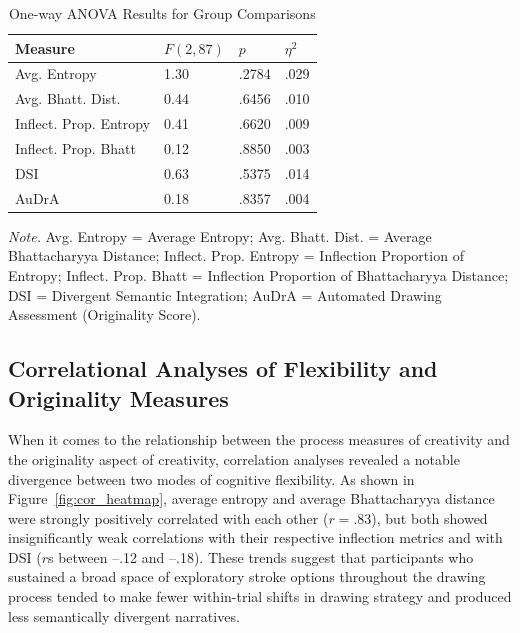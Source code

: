 \documentclass[../MA_Thesis.tex]{subfiles}
\begin{document}
\begin{table}[H]
\centering
\begin{threeparttable}
\caption{One-way ANOVA Results for Group Comparisons}
\label{tab:anova_results}
\begin{tabularx}{\textwidth}{lXXX}
\toprule
\textbf{Measure} & \textbf{$F(2, 87)$} & \textbf{$p$} & \textbf{$\eta^2$} \\
\midrule
Avg. Entropy & 1.30 & .2784 & .029 \\
Avg. Bhatt. Dist. & 0.44 & .6456 & .010 \\
Inflect. Prop. Entropy & 0.41 & .6620 & .009 \\
Inflect. Prop. Bhatt & 0.12 & .8850 & .003 \\
DSI & 0.63 & .5375 & .014 \\
AuDrA & 0.18 & .8357 & .004 \\
\bottomrule
\end{tabularx}
\begin{tablenotes}[flushleft]
\small
\item \textit{Note.} Avg. Entropy = Average Entropy; Avg. Bhatt. Dist. = Average Bhattacharyya Distance; Inflect. Prop. Entropy = Inflection Proportion of Entropy; Inflect. Prop. Bhatt = Inflection Proportion of Bhattacharyya Distance; DSI = Divergent Semantic Integration; AuDrA = Automated Drawing Assessment (Originality Score).
\end{tablenotes}
\end{threeparttable}
\end{table}

\subsection*{Correlational Analyses of Flexibility and Originality Measures}

When it comes to the relationship between the process measures of creativity and the originality aspect of creativity, correlation analyses revealed a notable divergence between two modes of cognitive flexibility. As shown in Figure~\ref{fig:cor_heatmap}, average entropy and average Bhattacharyya distance were strongly positively correlated with each other ($r = .83$), but both showed insignificantly weak correlations with their respective inflection metrics and with DSI ($r$s between –.12 and –.18). These trends suggest that participants who sustained a broad space of exploratory stroke options throughout the drawing process tended to make fewer within-trial shifts in drawing strategy and produced less semantically divergent narratives.
\end{document}
